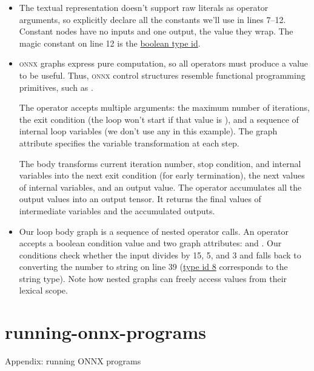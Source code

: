 \documentclass{article}
\begin{document}
\begin{itemize}
\item
  The textual representation doesn't support raw literals as operator arguments,
  so explicitly declare all the constants we'll use in lines 7--12.
  Constant nodes have no inputs and one output, the value they wrap.
  The magic constant  on line 12 is the \href{https://github.com/onnx/onnx/blob/0277a1f62550c0b9edc3e1016a50a42dc4c73cf1/onnx/onnx.proto3#L515}{boolean type id}.
\item
  \textsc{onnx} graphs express pure computation, so all operators must produce a value to be useful.
  Thus, \textsc{onnx} control structures resemble functional programming primitives, such as \href{https://hackage.haskell.org/package/base-4.21.0.0/docs/Data-List.html#v:unfoldr}{}.

  The  operator accepts multiple arguments:
  the maximum number of iterations,
  the exit condition (the loop won't start if that value is ),
  and a sequence of internal loop variables (we don't use any in this example).
  The  graph attribute specifies the variable transformation at each step.

  The body transforms current iteration number, stop condition, and internal variables
  into the next exit condition (for early termination), the next values of internal variables, and an output value.
  The  operator accumulates all the output values into an output tensor.
  It returns the final values of intermediate variables and the accumulated outputs.

\item
  Our loop body graph is a sequence of nested \href{https://onnx.ai/onnx/operators/onnx__If.html}{} operator calls.
  An  operator accepts a boolean condition value and two graph attributes:  and .
  Our conditions check whether the input divides by 15, 5, and 3 and falls back to converting the number to string on line 39
  (\href{https://github.com/onnx/onnx/blob/0277a1f62550c0b9edc3e1016a50a42dc4c73cf1/onnx/onnx.proto3#L514}{type id 8} corresponds to the string type).
  Note how nested graphs can freely access values from their lexical scope.
\end{itemize}

\section{running-onnx-programs}{Appendix: running ONNX programs}
\end{document}
